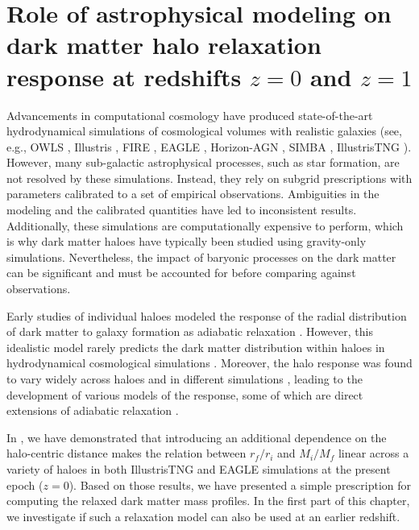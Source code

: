 \chapter[Role of astrophysical modeling and epoch]{Role of astrophysical modeling on dark matter halo relaxation response at redshifts $z=0$ and $z=1$}
\label{chap:physvar_z01}

Advancements in computational cosmology have produced state-of-the-art hydrodynamical simulations of cosmological volumes with realistic galaxies (see, e.g., OWLS \citep{2010MNRAS.402.1536S}, Illustris \citep{2014MNRAS.445..175G}, FIRE \citep{2014MNRAS.445..581H}, EAGLE \citep{2015MNRAS.446..521S}, Horizon-AGN \citep[][]{2017MNRAS.467.4739K}, SIMBA \citep[][]{2019MNRAS.486.2827D}, IllustrisTNG \citep{2019ComAC...6....2N}). However, many sub-galactic astrophysical processes, such as star formation, are not resolved by these simulations. Instead, they rely on subgrid prescriptions with parameters calibrated to a set of empirical observations. Ambiguities in the modeling and the calibrated quantities have led to inconsistent results. Additionally, these simulations are computationally expensive to perform, which is why dark matter haloes have typically been studied using gravity-only simulations. Nevertheless, the impact of baryonic processes on the dark matter can be significant and must be accounted for before comparing against observations.

Early studies of individual haloes modeled the response of the radial distribution of dark matter to galaxy formation as adiabatic relaxation \citep[][]{osti6457593,1984MNRAS.211..753B,1986ApJ...301...27B,1987ApJ...318...15R}. However, this idealistic model rarely predicts the dark matter distribution within haloes in hydrodynamical cosmological simulations \citep[e.g.,][]{2004ApJ...616...16G,2010MNRAS.407..435A}. Moreover, the halo response was found to vary widely across haloes and in different simulations \citep[][]{2004ApJ...616...16G,2006PhRvD..74l3522G,2010MNRAS.402..776P,2010MNRAS.406..922T,2010MNRAS.405.2161D,2010MNRAS.407..435A,2011MNRAS.414..195T,2016MNRAS.461.2658D,2019A&A...622A.197A,2022MNRAS.511.3910F,2023Velmani&Paranjape}, leading to the development of various models of the response, some of which are direct extensions of adiabatic relaxation \citep[e.g.,][]{2004ApJ...616...16G,2006PhRvD..74l3522G,2010MNRAS.407..435A}. ~

In , we have demonstrated that introducing an additional dependence on the halo-centric distance makes the relation between $r_f/r_i$ and $M_i/M_f$ linear across a variety of haloes in both IllustrisTNG and EAGLE simulations at the present epoch ($z=0$). Based on those results, we have presented a simple prescription for computing the relaxed dark matter mass profiles. In the first part of this chapter, we investigate if such a relaxation model can also be used at an earlier redshift.

